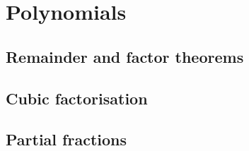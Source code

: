 
\section{Polynomials}

\subsection{Remainder and factor theorems}


\subsection{Cubic factorisation}


\subsection{Partial fractions}

